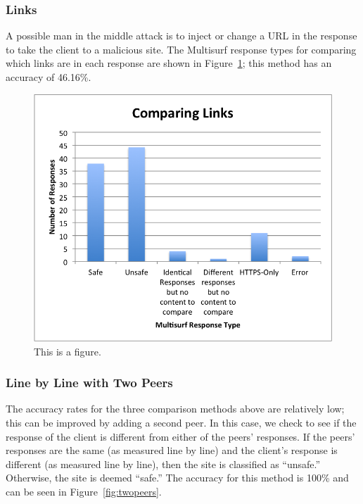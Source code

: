 \subsubsection{Links}
A possible man in the middle attack is to inject or change a URL in the response to take the client to a malicious site.  The Multisurf response types for comparing which links are in each response are shown in Figure~\ref{fig:links}; this method has an accuracy of 46.16\%. 

\begin{figure}[htb]
\label{fig:links}
\begin{center}
\includegraphics[width=\linewidth]{links}
\caption{This is a figure.}
\end{center}
\end{figure}

\subsubsection{Line by Line with Two Peers}
The accuracy rates for the three comparison methods above are relatively low; this can be improved by adding a second peer.  In this case, we check to see if the response of the client is different from either of the peers' responses.  If the peers' responses are the same (as measured line by line) and the client's response is different (as measured line by line), then the site is classified as ``unsafe.''  Otherwise, the site is deemed ``safe.''  The accuracy for this method is 100\% and can be seen in Figure~\ref{fig:twopeers}.

